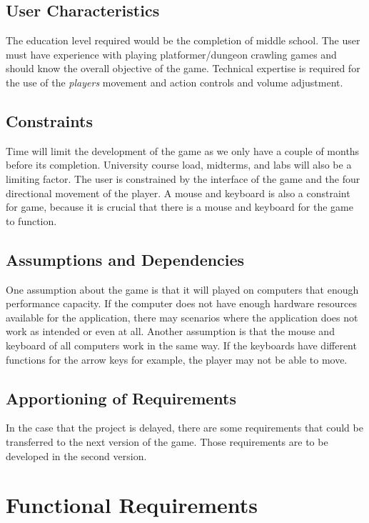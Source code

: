 \documentclass[12pt, titlepage]{article}
\begin{document}
  \subsection{User Characteristics}
  The education level required would be the completion of middle school. The user must have experience with playing platformer/dungeon crawling games and should know the overall objective of the game. Technical expertise is required for the use of the \textit{players} movement and action controls and volume adjustment.
  \subsection{Constraints}
  Time will limit the development of the game as we only have a couple of months before its completion. University course load, midterms, and labs will also be a limiting factor. The user is constrained by the interface of the game and the four directional movement of the player. A mouse and keyboard is also a constraint for game, because it is crucial that there is a mouse and keyboard for the game to function. 
  \subsection{Assumptions and Dependencies}
  One assumption about the game is that it will played on computers that enough performance capacity. If the computer does not have enough hardware resources available for the application, there may scenarios where the application does not work as intended or even at all. Another assumption is that the mouse and keyboard of all computers work in the same way. If the keyboards have different functions for the arrow keys for example, the player may not be able to move.
  \subsection{Apportioning of Requirements}
  In the case that the project is delayed, there are some requirements that could be transferred to the next version of the game. Those requirements are to be developed in the second version.

\section{Functional Requirements}
\end{document}
